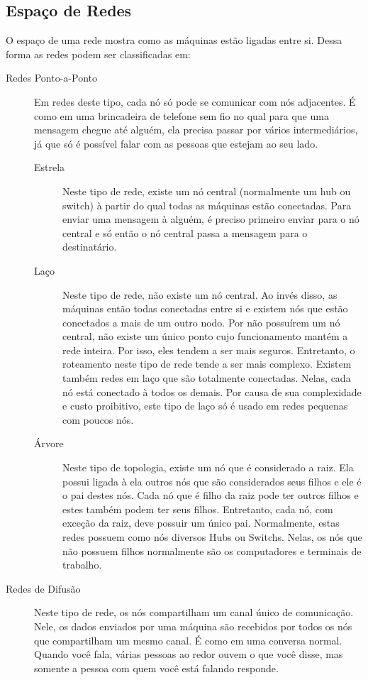 	\subsection{Espaço de Redes}
	O espaço de uma rede mostra como as máquinas estão ligadas entre si. Dessa forma as redes podem ser classificadas em:
	\begin{description}
		\item[Redes Ponto-a-Ponto] Em redes deste tipo, cada nó só pode se comunicar com nós adjacentes. É como em uma brincadeira de telefone sem fio no qual para que uma mensagem chegue até alguém, ela precisa passar por vários intermediários, já que só é possível falar com as pessoas que estejam ao seu lado.
			\begin{description}
				\item[Estrela] Neste tipo de rede, existe um nó central (normalmente um hub ou switch) à partir do qual todas as máquinas estão conectadas. Para enviar uma mensagem à alguém, é preciso primeiro enviar para o nó central e só então o nó central passa a mensagem para o destinatário.
				\item[Laço] Neste tipo de rede, não existe um nó central. Ao invés disso, as máquinas então todas conectadas entre si e existem nós que estão conectados a mais de um outro nodo. Por não possuírem um nó central, não existe um único ponto cujo funcionamento mantém a rede inteira. Por isso, eles tendem a ser mais seguros. Entretanto, o roteamento neste tipo de rede tende a ser mais complexo. Existem também redes em laço que são totalmente conectadas. Nelas, cada nó está conectado à todos os demais. Por causa de sua complexidade e custo proibitivo, este tipo de laço só é usado em redes pequenas com poucos nós.
				\item[Árvore] Neste tipo de topologia, existe um nó que é considerado a raiz. Ela possui ligada à ela outros nós que são considerados seus filhos e ele é o pai destes nós. Cada nó que é filho da raiz pode ter outros filhos e estes também podem ter seus filhos. Entretanto, cada nó, com exceção da raiz, deve possuir um único pai. Normalmente, estas redes possuem como nós diversos Hubs ou Switchs. Nelas, os nós que não possuem filhos normalmente são os computadores e terminais de trabalho.
			\end{description}
		\item[Redes de Difusão] Neste tipo de rede, os nós compartilham um canal único de comunicação. Nele, os dados enviados por uma máquina são recebidos por todos os nós que compartilham um mesmo canal. É como em uma conversa normal. Quando você fala, várias pessoas ao redor ouvem o que você disse, mas somente a pessoa com quem você está falando responde.

\end{description}
